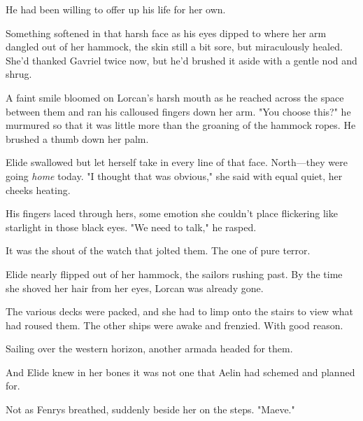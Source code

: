 He had been willing to offer up his life for her own.

Something softened in that harsh face as his eyes dipped to where her arm dangled out of her hammock, the skin still a bit sore, but 
miraculously healed. She'd thanked Gavriel twice now, but he'd brushed it aside with a gentle nod and shrug.

A faint smile bloomed on Lorcan's harsh mouth as he reached across the space between them and ran his calloused fingers down her arm. "You choose this?" he murmured so that it was little more than the groaning of the hammock ropes. He brushed a thumb down her palm.

Elide swallowed but let herself take in every line of that face. North---they were going \emph{home} today. "I thought that was obvious," she said with equal quiet, her cheeks heating.

His fingers laced through hers, some emotion she couldn't place flickering like starlight in those black eyes. "We need to talk," he rasped.

It was the shout of the watch that jolted them. The one of pure terror.

Elide nearly flipped out of her hammock, the sailors rushing past. By the time she shoved her hair from her eyes, Lorcan was already gone.

The various decks were packed, and she had to limp onto the stairs to view what had roused them. The other ships were awake and frenzied. With good reason.

Sailing over the western horizon, another armada headed for them.

And Elide knew in her bones it was not one that Aelin had schemed and planned for.

Not as Fenrys breathed, suddenly beside her on the steps. "Maeve."

